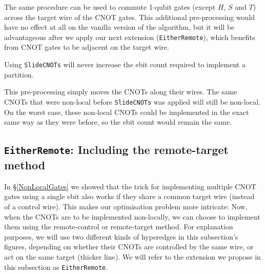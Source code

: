 

The same procedure can be used to commute 1-qubit gates (except \(H\), \(S\) and \(T\)) across the target wire of the CNOT gates. This additional pre-processing would have no effect at all on the vanilla version of the algorithm, but it will be advantageous after we apply our next extension (\texttt{EitherRemote}), which benefits from CNOT gates to be adjacent on the target wire.

\begin{remark} 
Using \texttt{SlideCNOTs} will never increase the ebit count required to implement a partition.

\normalfont
This pre-processing simply moves the CNOTs along their wires. The same CNOTs that were non-local before \texttt{SlideCNOTs} was applied will still be non-local. On the worst case, these non-local CNOTs could be implemented in the exact same way as they were before, so the ebit count would remain the same.

\label{thm:SlideCNOTsImprove}
\end{remark}

\subsection{\texttt{EitherRemote}: Including the remote-target method}
\label{BothEnds}

In \S\ref{NonLocalGates} we showed that the trick for implementing multiple CNOT gates using a single ebit also works if they share a common target wire (instead of a control wire). This makes our optimisation problem more intricate: Now, when the CNOTs are to be implemented non-locally, we can choose to implement them using the remote-control or remote-target method. For explanation purposes, we will use two different kinds of hyperedges in this subsection's figures, depending on whether their CNOTs are controlled by the same wire, or act on the same target (thicker line). We will refer to the extension we propose in this subsection as \texttt{EitherRemote}.



